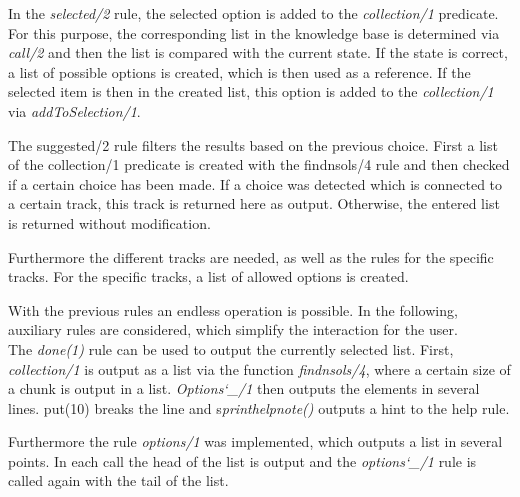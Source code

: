 \documentclass{article}
\begin{document}
	
	
	In the \textit{selected/2} rule, the selected option is added to the \textit{collection/1} predicate. For this purpose, the corresponding list in the knowledge base is determined via \textit{call/2} and then the list is compared with  the current state.
	If the state is correct, a list of possible options is created, which is then used as a reference. If the selected item is then in the created list, this option is added to the \textit{collection/1} via \textit{addToSelection/1}. 
	
	
	
	
	
	The suggested/2 rule filters the results based on the previous choice. First a list of the collection/1 predicate is created with the findnsols/4 rule and then checked if a certain choice has been made. If a choice was detected which is connected to a certain track, this track is returned here as output. Otherwise, the entered list is returned without modification.
	
	
	
	Furthermore the different tracks are needed, as well as the rules for the specific tracks. For the specific tracks, a list of allowed options is created.
	
	
	
	With the previous rules an endless operation is possible. In the following, auxiliary rules are considered, which simplify the interaction for the user.\\
	The \textit{done(1)} rule can be used to output the currently selected list. First, \textit{collection/1} is output as a list via the function \textit{findnsols/4}, where a certain size of a chunk is output in a list. \textit{Options\char`_/1} then outputs the elements in several lines. put(10) breaks the line and s\textit{printhelpnote()} outputs a hint to the help rule.
	
	
	
	Furthermore the rule \textit{options/1} was implemented, which outputs a list in several points. In each call the head of the list is output and the \textit{options\char`_/1} rule is called again with the tail of the list. 
	
\end{document}
